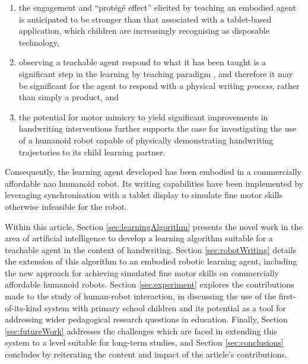 \documentclass{sig-alternate}
\begin{document}
\begin{enumerate}
    \item the engagement and ``protégé effect'' elicited by teaching an embodied
        agent is anticipated to be stronger than that associated with a
        tablet-based application, which children are increasingly recognising as
        disposable technology,%
%
%

    \item observing a teachable agent respond to what it has been taught
        is a significant step in the learning by teaching
        paradigm \cite{Okita2006}, and therefore it may be significant for the agent to respond
        with a physical writing \emph{process}, rather than simply a product, and

    \item the potential for motor mimicry to yield significant improvements in
        handwriting interventions \cite{Berninger1997} further supports the case
        for investigating the use of a humanoid robot capable of physically
        demonstrating handwriting trajectories to its child learning partner.
\end{enumerate}
%
%
Consequently, the learning agent developed has been embodied in a commercially
affordable {\sc nao} humanoid robot. Its writing capabilities have been implemented by
leveraging synchronisation with a tablet display to simulate fine motor skills
otherwise infeasible for the robot. 

Within this article, Section \ref{sec:learningAlgorithm} presents the novel work in the area of
artificial intelligence to develop a learning algorithm suitable for a teachable
agent in the context of handwriting. Section \ref{sec:robotWriting} details the
extension of this algorithm to an embodied robotic learning agent, including the
new approach for achieving simulated fine motor skills on commercially
affordable humanoid robots.  Section \ref{sec:experiment} explores the 
contributions made to the study of human-robot interaction, in discussing the
use of the first-of-its-kind system with primary school children and its potential as a tool for
addressing wider pedagogical research questions in education. Finally, Section \ref{sec:futureWork} addresses the challenges which are faced in extending this system to a level suitable for long-term studies, and Section \ref{sec:conclusions} concludes by reiterating the content and impact of the article's contributions.
\end{document}
